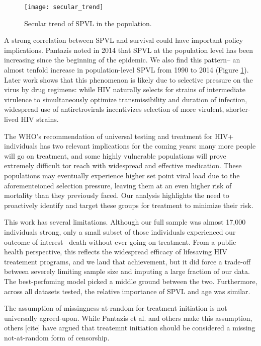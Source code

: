 \documentclass[12pt, titlepage, proquest]{article}
\begin{document}
\begin{figure}
	\caption{Secular trend of SPVL in the population.}
	\label{secular_trend}
		\texttt{[image: secular\_trend]}
\end{figure}

A strong correlation between SPVL and survival could have important policy implications. Pantazis noted in 2014 \cite{pantazis_temporal_2014} that SPVL at the population level has been increasing since the beginning of the epidemic. We also find this pattern-- an almost tenfold increase in population-level SPVL from 1990 to 2014 (Figure \ref{secular_trend}). Later work \cite{herbeck_evolution_2016} shows that this phenomenon is likely due to selective pressure on the virus by drug regimens: while HIV naturally selects for strains of intermediate virulence to simultaneously optimize transmissibility and duration of infection, widespread use of antiretrovirals incentivizes selection of more virulent, shorter-lived HIV strains.

The WHO's recommendation of universal testing and treatment for HIV+ individuals has two relevant implications for the coming years: many more people will go on treatment, and some highly vulnerable populations will prove extremely difficult tor reach with widespread and effective medication. These populations may eventually experience higher set point viral load due to the aforementeioned selection pressure, leaving them at an even higher risk of mortality than they previously faced. Our analysis highlights the need to proactively identify and target these groups for treatment to minimize their risk.

This work has several limitations. Although our full sample was almost 17,000 individuals strong, only a small subset of those individuals experienced our outcome of interest-- death without ever going on treatment. From a public health perspective, this reflects the widespread efficacy of lifesaving HIV treatement programs, and we laud that achievement, but it did force a trade-off between severely limiting sample size and imputing a large fraction of our data. The best-perfoming model picked a middle ground between the two. Furthermore, across all datasets tested, the relative importance of SPVL and age was similar. 

The assumption of missingness-at-random for treatment initiation is not universally agreed-upon. While Pantazis et al. and others make this assumption, others [cite] have argued that treatemnt initiation should be considered a missing not-at-random form of censorship. 
\end{document}
